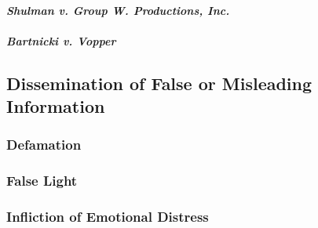 
\paragraph{\emph{Shulman v. Group W. Productions, Inc.}}


\paragraph{\emph{Bartnicki v. Vopper}}


\subsection{Dissemination of False or Misleading Information}

\subsubsection{Defamation}


\subsubsection{False Light}


\subsubsection{Infliction of Emotional Distress}

